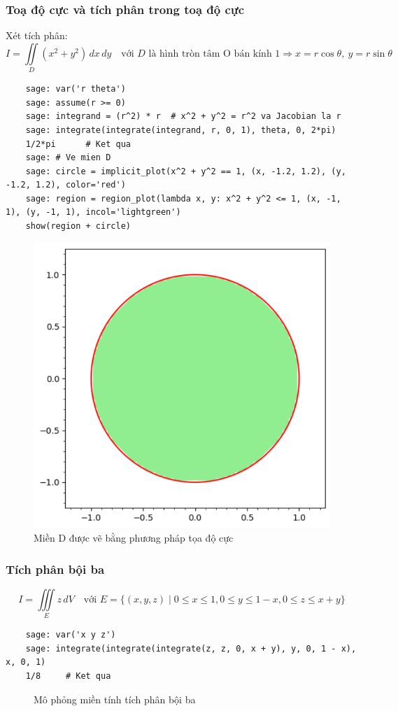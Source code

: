 \subsubsection{Toạ độ cực và tích phân trong toạ độ cực}
Xét tích phân:
\[ I = \iint\limits_D (x^2 + y^2) \, dx \, dy \quad \text{với } D \text{ là hình tròn tâm O bán kính 1}
\Rightarrow x = r\cos\theta, \ y = r\sin\theta \]
\begin{lstlisting}
	sage: var('r theta')
	sage: assume(r >= 0)
	sage: integrand = (r^2) * r  # x^2 + y^2 = r^2 va Jacobian la r
	sage: integrate(integrate(integrand, r, 0, 1), theta, 0, 2*pi)
	1/2*pi		# Ket qua
	sage: # Ve mien D
	sage: circle = implicit_plot(x^2 + y^2 == 1, (x, -1.2, 1.2), (y, -1.2, 1.2), color='red')
	sage: region = region_plot(lambda x, y: x^2 + y^2 <= 1, (x, -1, 1), (y, -1, 1), incol='lightgreen')
	show(region + circle)
\end{lstlisting}
\begin{figure}[H]
	\centering
	\includegraphics[width=0.7\linewidth]{images/5212}
	\caption{Miền D được vẽ bằng phương pháp tọa độ cực}
	\label{fig:5212}
\end{figure}

\subsubsection{Tích phân bội ba}
\[ I = \iiint\limits_E z \, dV \quad \text{với } E = \{(x, y, z) \mid 0 \le x \le 1, 0 \le y \le 1 - x, 0 \le z \le x + y \} \]
\begin{lstlisting}
	sage: var('x y z')
	sage: integrate(integrate(integrate(z, z, 0, x + y), y, 0, 1 - x), x, 0, 1)
	1/8		# Ket qua
\end{lstlisting}
\begin{figure}[H]
	\centering
	\caption{Mô phỏng miền tính tích phân bội ba}
	\label{fig:truc-toa-do}
\end{figure}

